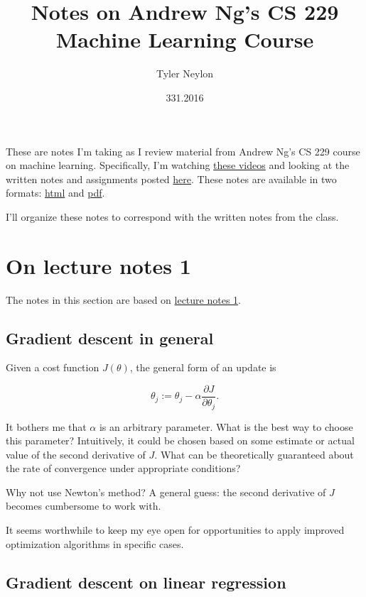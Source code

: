 \documentclass[]{article}
\title{Notes on Andrew Ng's CS 229 Machine Learning Course}
\author{Tyler Neylon}
\date{331.2016}
\begin{document}
\maketitle

\newcommand{\R}{\mathbb{R}}
\newcommand{\eqnset}[1]{\left.\mbox{$#1$}\quad\quad\right\rbrace}
\newcommand{\tr}{\text{tr}\;}

These are notes I'm taking as I review material from Andrew Ng's CS 229
course on machine learning. Specifically, I'm watching
\href{https://www.youtube.com/view_play_list?p=A89DCFA6ADACE599}{these
videos} and looking at the written notes and assignments posted
\href{http://cs229.stanford.edu/materials.html}{here}. These notes are
available in two formats:
\href{http://tylerneylon.com/notes/cs229/cs229.html}{html} and
\href{http://tylerneylon.com/notes/cs229/cs229.pdf}{pdf}.

I'll organize these notes to correspond with the written notes from the
class.

\section{On lecture notes 1}\label{on-lecture-notes-1}

The notes in this section are based on
\href{http://cs229.stanford.edu/notes/cs229-notes1.pdf}{lecture notes
1}.

\subsection{Gradient descent in
general}\label{gradient-descent-in-general}

Given a cost function \(J(\theta)\), the general form of an update is

\[\theta_j := \theta_j - \alpha\frac{\partial J}{\partial \theta_j}.\]

It bothers me that \(\alpha\) is an arbitrary parameter. What is the
best way to choose this parameter? Intuitively, it could be chosen based
on some estimate or actual value of the second derivative of \(J\). What
can be theoretically guaranteed about the rate of convergence under
appropriate conditions?

Why not use Newton's method? A general guess: the second derivative of
\(J\) becomes cumbersome to work with.

It seems worthwhile to keep my eye open for opportunities to apply
improved optimization algorithms in specific cases.

\subsection{Gradient descent on linear
regression}\label{gradient-descent-on-linear-regression}
\end{document}
